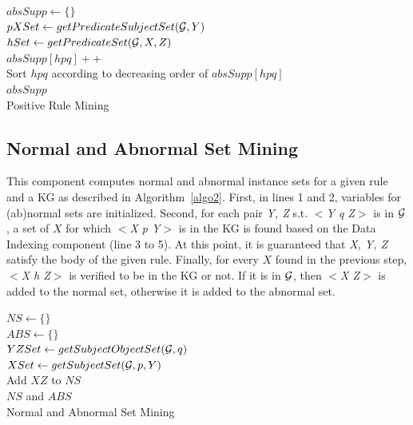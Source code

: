 \IncMargin{1.5em}
\begin{algorithm}[H]
\DontPrintSemicolon
\SetAlgoLined
{}
\BlankLine
$absSupp \leftarrow \{\}$\\
\BlankLine
{} {
    \BlankLine
	$pXSet \leftarrow getPredicateSubjectSet(\mathcal{G}, Y)$\\
	 {
		$hSet \leftarrow getPredicateSet(\mathcal{G}, X, Z)$\\
		 {
			$absSupp[hpq]++$\\
		}
	}
}
\BlankLine
Sort $hpq$ according to decreasing order of $absSupp[hpq]$\\
\Return $absSupp$\\
\caption{Positive Rule Mining}
\label{algo1}
\end{algorithm}
\DecMargin{1.5em}

\subsection{Normal and Abnormal Set Mining}

This component computes normal and abnormal instance sets for a given rule and a KG as described in Algorithm~\ref{algo2}. First, in lines 1 and 2, variables for (ab)normal sets are initialized. Second, for each pair \textit{Y, Z} s.t. \textit{$<$Y q Z$>$} is in $\mathcal{G}$, a set of $X$ for which \textit{$<$X p Y$>$} is in the KG is found based on the Data Indexing component (line 3 to 5). At this point, it is guaranteed that \textit{X, Y, Z} satisfy the body of the given rule. Finally, for every $X$ found in the previous step, \textit{$<$X h Z$>$} is verified to be in the KG or not. If it is in $\mathcal{G}$, then \textit{$<$X Z$>$} is added to the normal set, otherwise it is added to the abnormal set.

\IncMargin{1.5em}
\begin{algorithm}[H]
\DontPrintSemicolon
\SetAlgoLined
{}
\BlankLine
$NS \leftarrow \{\}$\\
$ABS \leftarrow \{\}$\\
$YZSet \leftarrow getSubjectObjectSet(\mathcal{G}, q)$\\
\BlankLine
{} {
    \BlankLine
	$XSet \leftarrow getSubjectSet(\mathcal{G}, p, Y)$\\
	 {
	 {
		Add $XZ$ to $NS$\\
	}
	}
}
\BlankLine
\Return $NS$ and $ABS$\\
\caption{Normal and Abnormal Set Mining}
\label{algo2}
\end{algorithm}
\DecMargin{1.5em}

